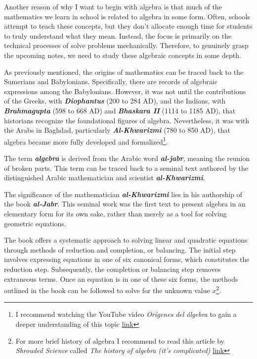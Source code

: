 Another reason of why I want to begin with algebra is that much of the mathematics we learn in school is related to algebra in some form. Often, schools attempt to teach these concepts, but they don't allocate enough time for students to truly understand what they mean. Instead, the focus is primarily on the technical processes of solve problems mechanically. Therefore, to genuinely grasp the upcoming notes, we need to study these algebraic concepts in some depth.

As previously mentioned, the origins of mathematics can be traced back to the Sumerians and Babylonians. Specifically, there are records of algebraic expressions among the Babylonians. However, it was not until the contributions of the Greeks, with \textbf{\textit{Diophantus}} (200 to 284 AD), and the Indians, with \textbf{\textit{Brahmagupta}} (598 to 668 AD) and \textbf{\textit{Bhaskara II}} (1114 to 1185 AD), that historians recognize the foundational figures of algebra. Nevertheless, it was with the Arabs in Baghdad, particularly \textit{\textbf{Al-Khwarizmi}} (780 to 850 AD), that algebra became more fully developed and formalized\footnote{I recommend watching the YouTube video \textit{Orígenes del álgebra} to gain a deeper understanding of this topic \href{https://www.youtube.com/watch?v=akS2vnuAol4}{link}}.

The term \textbf{\textit{algebra}} is derived from the Arabic word \textbf{\textit{al-jabr}}, meaning the reunion of broken parts. This term can be traced back to a seminal text authored by the distinguished Arabic mathematician and scientist \textbf{\textit{al-Khwarizmi}}.

The significance of the mathematician \textbf{\textit{al-Khwarizmi}} lies in his authorship of the book \textbf{\textit{al-Jabr}}. This seminal work was the first text to present algebra in an elementary form for its own sake, rather than merely as a tool for solving geometric equations.

The book offers a systematic approach to solving linear and quadratic equations through methods of reduction and completion, or balancing. The initial step involves expressing equations in one of six canonical forms, which constitutes the reduction step. Subsequently, the completion or balancing step removes extraneous terms. Once an equation is in one of these six forms, the methods outlined in the book can be followed to solve for the unknown value $x$\footnote{For more brief history of algebra I recommend to read this article by \textit{Shrouded Science} called \textit{The history of algebra (it’s complicated)} \href{https://shroudedscience.medium.com/the-history-of-algebra-its-complicated-5f806c60de9d}{link}}.

